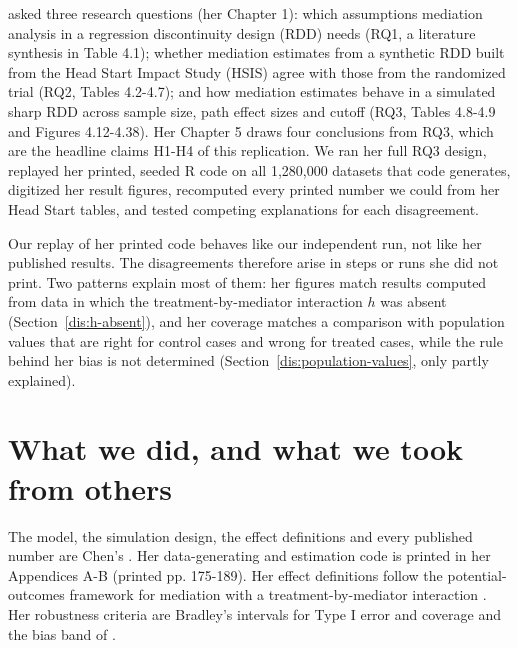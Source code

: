 \citet{chen2021} asked three research questions (her Chapter 1): which assumptions mediation analysis in a regression discontinuity design (RDD) needs (RQ1, a literature synthesis in Table 4.1); whether mediation estimates from a synthetic RDD built from the Head Start Impact Study (HSIS) agree with those from the randomized trial (RQ2, Tables 4.2-4.7); and how mediation estimates behave in a simulated sharp RDD across sample size, path effect sizes and cutoff (RQ3, Tables 4.8-4.9 and Figures 4.12-4.38). Her Chapter 5 draws four conclusions from RQ3, which are the headline claims H1-H4 of this replication. We ran her full RQ3 design, replayed her printed, seeded R code on all 1,280,000 datasets that code generates, digitized her result figures, recomputed every printed number we could from her Head Start tables, and tested competing explanations for each disagreement.

Our replay of her printed code behaves like our independent run, not like her published results. The disagreements therefore arise in steps or runs she did not print. Two patterns explain most of them: her figures match results computed from data in which the treatment-by-mediator interaction $h$ was absent (Section~\ref{dis:h-absent}), and her coverage matches a comparison with population values that are right for control cases and wrong for treated cases, while the rule behind her bias is not determined (Section~\ref{dis:population-values}, only partly explained).

\section{What we did, and what we took from others}\label{sec:contrib}

The model, the simulation design, the effect definitions and every published number are Chen's \citep{chen2021}. Her data-generating and estimation code is printed in her Appendices A-B (printed pp. 175-189). Her effect definitions follow the potential-outcomes framework for mediation with a treatment-by-mediator interaction \citep{valeri2013,vanderweele2015}. Her robustness criteria are Bradley's intervals for Type I error and coverage \citep{bradley1978} and the bias band of \citet{hoogland1998}.

